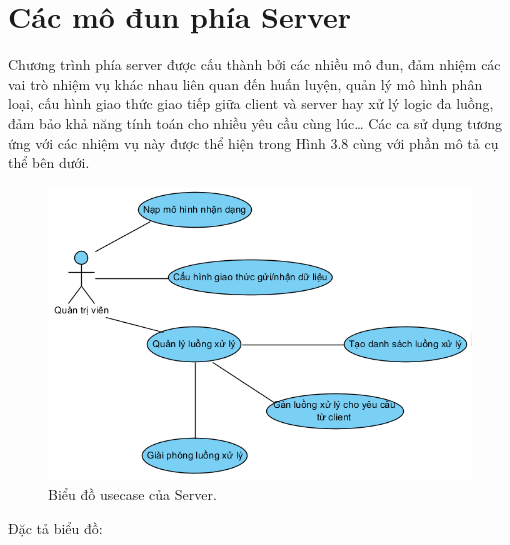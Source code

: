 \section{Các mô đun phía Server}
Chương trình phía server được cấu thành bởi các nhiều mô đun, đảm nhiệm các vai trò nhiệm vụ khác nhau liên quan đến huấn luyện, quản lý mô hình phân loại, cấu hình giao thức giao tiếp giữa client và server hay xử lý logic đa luồng, đảm bảo khả năng tính toán cho nhiều yêu cầu cùng lúc… Các ca sử dụng tương ứng với các nhiệm vụ này được thể hiện trong Hình 3.8 cùng với phần mô tả cụ thể bên dưới.
\begin{figure}[H]
	\centering
	\includegraphics[width=1\linewidth]{images/usecase_server}
	\caption{Biểu đồ usecase của Server.}
	\label{fig:usecase_server}
\end{figure}
Đặc tả biểu đồ:
